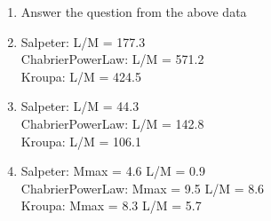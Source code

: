 \documentclass{article}
\begin{document}
\begin{enumerate}
\begin{enumerate}
\item Answer the question from the above data
\item %
    Salpeter: L/M = 177.3 \\
ChabrierPowerLaw: L/M = 571.2 \\
Kroupa: L/M = 424.5
\item %
    Salpeter: L/M = 44.3 \\
ChabrierPowerLaw: L/M = 142.8 \\
Kroupa: L/M = 106.1
\item %
Salpeter: Mmax = 4.6 L/M = 0.9 \\
ChabrierPowerLaw: Mmax = 9.5 L/M = 8.6 \\
Kroupa: Mmax = 8.3 L/M = 5.7
\end{enumerate}
\end{enumerate}
\end{document}
